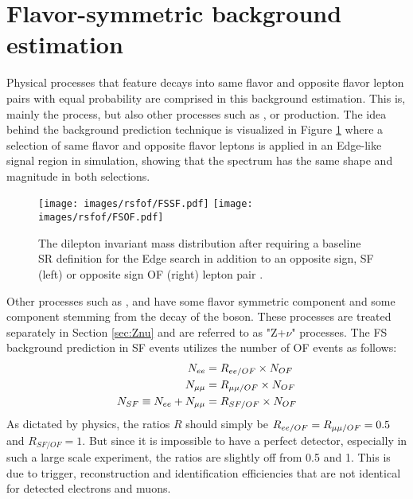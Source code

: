 \section{Flavor-symmetric background estimation}\label{sec:fsBG}
\noindent
\justify
Physical processes that feature decays into same flavor and opposite flavor lepton pairs with equal probability are comprised in this background estimation. 
This is, mainly the \ttbar process, but also other processes such as \PWW, or \ttW production.
\newpara
\noindent\justify
The idea behind the background prediction technique is visualized in Figure \ref{fig:rsfofMC} where a selection of same flavor and opposite flavor leptons is applied in an Edge-like signal region in simulation, showing that the \ttbar spectrum has the same shape and magnitude in both selections.    
\begin{figure}[htbp!]
\begin{center}
    \texttt{[image: images/rsfof/FSSF.pdf]}
    \texttt{[image: images/rsfof/FSOF.pdf]} 
    \caption{The dilepton invariant mass distribution after requiring a baseline SR definition for the Edge search in addition to an opposite sign, SF (left) or opposite sign OF (right) lepton pair \cite{Sirunyan:2017qaj}.}
\label{fig:rsfofMC}
\end{center}
\end{figure}                                                                               
Other processes such as \PWZ, \PZZ and \ttZ have some flavor symmetric component and some component stemming from the decay of the \PZ boson.
These processes are treated separately in Section \ref{sec:Znu} and are referred to as "Z+$\nu$" processes. 
The FS background prediction in SF events utilizes the number of OF events as follows:
\begin{align}
\label{eq:masterformula}
    N_{ee} & = R_{ee/OF} \times N_{OF}\notag \\
    N_{\mu\mu} & = R_{\mu\mu/OF} \times N_{OF}\notag\\
    N_{SF} \equiv N_{ee} + N_{\mu\mu} & = R_{SF/OF} \times N_{OF}
\end{align}
As dictated by physics, the ratios $R$ should simply be $R_{ee/OF}=R_{\mu\mu/OF}=0.5$ and $R_{SF/OF}=1$.
But since it is impossible to have a perfect detector, especially in such a large scale experiment, the ratios are slightly off from 0.5 and 1. 
This is due to trigger, reconstruction and identification efficiencies that are not identical for detected electrons and muons. 
